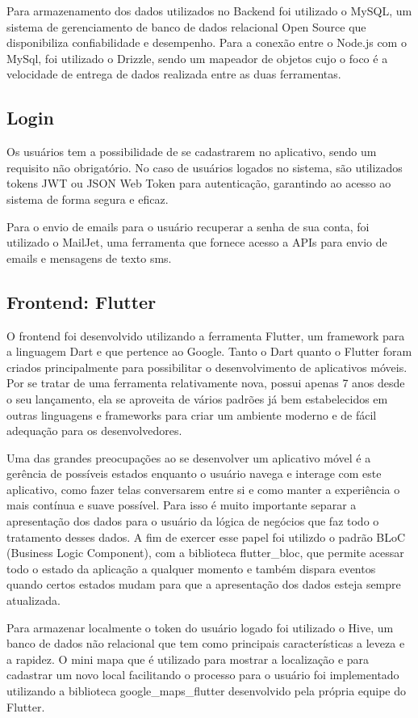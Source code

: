 \documentclass[12pt]{article}
\begin{document}
Para armazenamento dos dados utilizados no Backend foi utilizado o MySQL, um sistema de gerenciamento de banco de dados relacional Open Source que disponibiliza confiabilidade e desempenho. Para a conexão entre o Node.js com o MySql, foi utilizado o Drizzle, sendo um mapeador de objetos cujo o foco é a velocidade de entrega de dados realizada entre as duas ferramentas.

\subsection{Login}
Os usuários tem a possibilidade de se cadastrarem no aplicativo, sendo um requisito não obrigatório. No caso de usuários logados no sistema, são utilizados tokens JWT ou JSON Web Token para autenticação, garantindo ao acesso ao sistema de forma segura e eficaz.

Para o envio de emails para o usuário recuperar a senha de sua conta, foi utilizado o MailJet, uma ferramenta que fornece acesso a APIs para envio de emails e mensagens de texto sms.

\subsection{Frontend: Flutter}
O frontend foi desenvolvido utilizando a ferramenta Flutter, um framework para a linguagem Dart e que pertence ao Google. Tanto o Dart quanto o Flutter foram criados principalmente para possibilitar o desenvolvimento de aplicativos móveis. Por se tratar de uma ferramenta relativamente nova, possui apenas 7 anos desde o seu lançamento, ela se aproveita de vários padrões já bem estabelecidos em outras linguagens e frameworks para criar um ambiente moderno e de fácil adequação para os desenvolvedores.

Uma das grandes preocupações ao se desenvolver um aplicativo móvel é a gerência de possíveis estados enquanto o usuário navega e interage com este aplicativo, como fazer telas conversarem entre si e como manter a experiência o mais contínua e suave possível. Para isso é muito importante separar a apresentação dos dados para o usuário da lógica de negócios que faz todo o tratamento desses dados. A fim de exercer esse papel foi utilizdo o padrão BLoC (Business Logic Component), com a biblioteca flutter\_bloc, que permite acessar todo o estado da aplicação a qualquer momento e também dispara eventos quando certos estados mudam para que a apresentação dos dados esteja sempre atualizada.

Para armazenar localmente o token do usuário logado foi utilizado o Hive, um banco de dados não relacional que tem como principais características a leveza e a rapidez. O mini mapa que é utilizado para mostrar a localização e para cadastrar um novo local facilitando o processo para o usuário foi implementado utilizando a biblioteca google\_maps\_flutter desenvolvido pela própria equipe do Flutter. 
\end{document}
